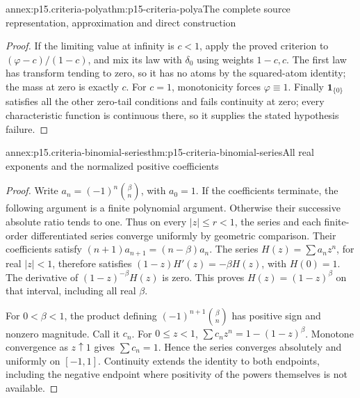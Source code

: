 \begin{annexitem}{annex:p15.criteria-polya}{thm:p15-criteria-polya}{The complete source representation, approximation and direct construction}
\begin{proof}
If the limiting value at infinity is \(c<1\), apply
the proved criterion to \((\varphi-c)/(1-c)\), and
mix its law with \(\delta_0\) using weights \(1-c,c\).
The first law has transform tending to zero, so it
has no atoms by the squared-atom identity; the mass
at zero is exactly \(c\).
For \(c=1\), monotonicity forces \(\varphi\equiv1\).
Finally \(\mathbf1_{\{0\}}\) satisfies all the other
zero-tail conditions and fails continuity at zero;
every characteristic function is continuous there,
so it supplies the stated hypothesis failure.
\end{proof}
\end{annexitem}

\begin{annexitem}{annex:p15.criteria-binomial-series}{thm:p15-criteria-binomial-series}{All real exponents and the normalized positive coefficients}
\begin{proof}
Write \(a_n=(-1)^n\binom\beta n\), with \(a_0=1\).
If the coefficients terminate, the following argument
is a finite polynomial argument. Otherwise their
successive absolute ratio tends to one.
Thus on every \(|z|\leq r<1\), the series and each
finite-order differentiated series converge uniformly
by geometric comparison.
Their coefficients satisfy
\((n+1)a_{n+1}=(n-\beta)a_n\).
The series \(H(z)=\sum a_nz^n\), for real \(|z|<1\),
therefore satisfies
\((1-z)H'(z)=-\beta H(z)\), with \(H(0)=1\).
The derivative of \((1-z)^{-\beta}H(z)\) is zero.
This proves \(H(z)=(1-z)^\beta\) on that interval,
including all real \(\beta\).

For \(0<\beta<1\), the product defining
\((-1)^{n+1}\binom\beta n\) has positive sign and
nonzero magnitude. Call it \(c_n\).
For \(0\leq z<1\),
\(\sum c_nz^n=1-(1-z)^\beta\).
Monotone convergence as \(z\uparrow1\) gives
\(\sum c_n=1\). Hence the series converges absolutely
and uniformly on \([-1,1]\).
Continuity extends the identity to both endpoints,
including the negative endpoint where positivity
of the powers themselves is not available.
\end{proof}
\end{annexitem}

